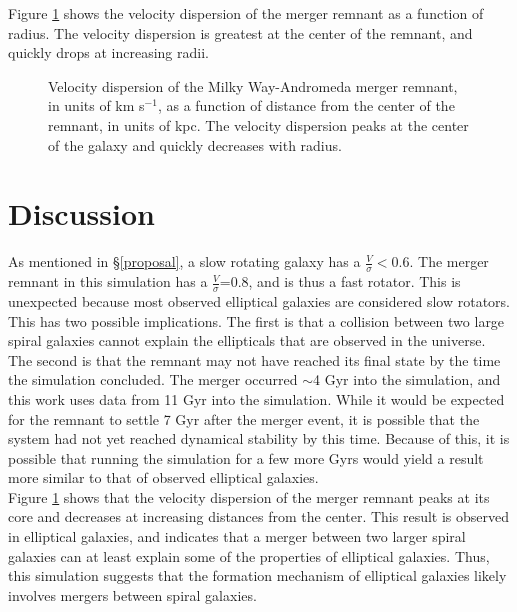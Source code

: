 \documentclass[twocolumn]{aastex63}
\begin{document}
Figure \ref{merger_disp} shows the velocity dispersion of the merger remnant as a function of radius. The velocity dispersion is greatest at the center of the remnant, and quickly drops at increasing radii.\\

\begin{figure}
    \centering
    \caption{Velocity dispersion of the Milky Way-Andromeda merger remnant, in units of km s$^{-1}$, as a function of distance from the center of the remnant, in units of kpc. The velocity dispersion peaks at the center of the galaxy and quickly decreases with radius.}
    \label{merger_disp}
\end{figure}

\section{Discussion}

As mentioned in \S \ref{proposal}, a slow rotating galaxy has a $\frac{V}{\sigma}<0.6$. The merger remnant in this simulation has a $\frac{V}{\sigma}$=0.8, and is thus a fast rotator. This is unexpected because most observed elliptical galaxies are considered slow rotators. This has two possible implications. The first is that a collision between two large spiral galaxies cannot explain the ellipticals that are observed in the universe. The second is that the remnant may not have reached its final state by the time the simulation concluded. The merger occurred $\sim$4 Gyr into the simulation, and this work uses data from 11 Gyr into the simulation. While it would be expected for the remnant to settle 7 Gyr after the merger event, it is possible that the system had not yet reached dynamical stability by this time. Because of this, it is possible that running the simulation for a few more Gyrs would yield a result more similar to that of observed elliptical galaxies.\\

Figure \ref{merger_disp} shows that the velocity dispersion of the merger remnant peaks at its core and decreases at increasing distances from the center. This result is observed in elliptical galaxies, and indicates that a merger between two larger spiral galaxies can at least explain some of the properties of elliptical galaxies. Thus, this simulation suggests that the formation mechanism of elliptical galaxies likely involves mergers between spiral galaxies.\\
\end{document}
